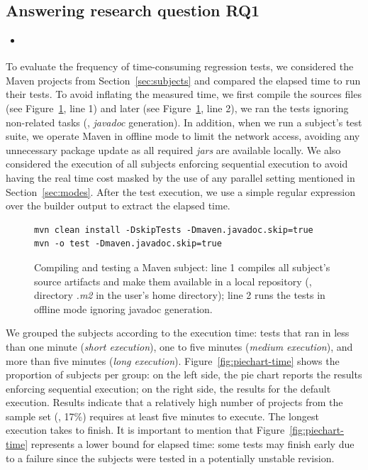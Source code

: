 \subsection{Answering research question RQ1}
\label{sec:rqone}

\begin{itemize}
    \item \emph{\RQA}
\end{itemize}

To evaluate the frequency of time-consuming regression tests, we
considered the  Maven projects from Section~\ref{sec:subjects}
and compared the elapsed time to run their tests.  To avoid inflating
the measured time, we first compile the sources files (see
Figure~\ref{fig:mvn-execution}, line 1) and later (see
Figure~\ref{fig:mvn-execution}, line 2), we ran the tests ignoring
non-related tasks (\eg, \emph{javadoc} generation). In addition, when
we run a subject's test suite, we operate Maven in offline mode to
limit the network access, avoiding any unnecessary package update as
all required \emph{jars} are available locally. We also considered the
execution of all subjects enforcing sequential execution to avoid
having the real time cost masked by the use of any parallel setting
mentioned in Section~\ref{sec:modes}.  After the test execution, we
use a simple regular expression over the builder output to extract the
elapsed time.

\begin{figure}[h!]
\centering
\scriptsize
{}
\begin{lstlisting}
mvn clean install -DskipTests -Dmaven.javadoc.skip=true
mvn -o test -Dmaven.javadoc.skip=true
\end{lstlisting}
\caption{\label{fig:mvn-execution} Compiling and testing a Maven
    subject: line 1 compiles all subject's source artifacts and make
    them available in a local repository (\ie, directory \emph{.m2} in
    the user's home directory); line 2 runs the tests in offline mode
    ignoring javadoc generation.}
\end{figure}

We grouped the subjects according to the execution time: tests that
ran in less than one minute (\emph{short execution}), one to five
minutes (\emph{medium execution}), and more than five minutes
(\emph{long execution}).  Figure~\ref{fig:piechart-time} shows the
proportion of subjects per group: on the left side, the pie chart
reports the results enforcing sequential execution; on the right side,
the results for the default execution.  Results indicate that a
relatively high number of projects from the sample set (\ie, 17\%)
requires at least five minutes to execute. The longest execution takes
 to finish. It is important to mention that
Figure~\ref{fig:piechart-time} represents a lower bound for elapsed
time: some tests may finish early due to a failure since the subjects
were tested in a potentially unstable revision.

